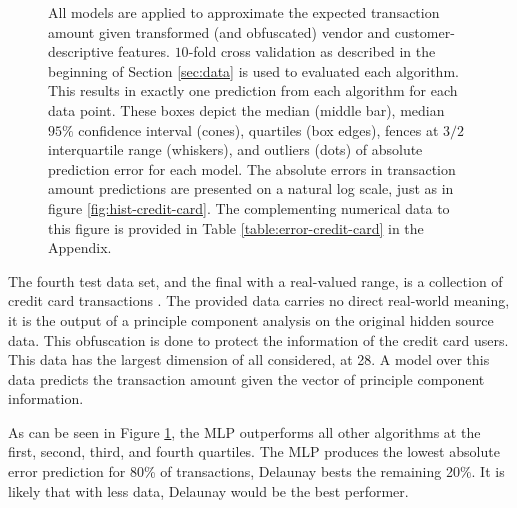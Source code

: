 \documentclass[smallextended,final]{svjour3}       %
\begin{document}
\begin{figure}
  \centering
  \caption{All models are applied to approximate the expected
    transaction amount given transformed (and obfuscated) vendor and
    customer-descriptive features. $10$-fold cross validation as
    described in the beginning of Section \ref{sec:data} is used to
    evaluated each algorithm. This results in exactly one prediction
    from each algorithm for each data point. These boxes depict the
    median (middle bar), median $95\%$ confidence interval (cones),
    quartiles (box edges), fences at $3/2$ interquartile range
    (whiskers), and outliers (dots) of absolute prediction error for
    each model. The absolute errors in transaction amount predictions
    are presented on a natural log scale, just as in figure
    \ref{fig:hist-credit-card}. The complementing numerical data to
    this figure is provided in Table \ref{table:error-credit-card} in
    the Appendix.}
  \label{fig:error-credit-card}
\end{figure}

The fourth test data set, and the final with a real-valued range, is a
collection of credit card transactions
\cite{pozzolo2015calibrating}. The provided data carries no direct
real-world meaning, it is the output of a principle component analysis
on the original hidden source data. This obfuscation is done to
protect the information of the credit card users. This data has the
largest dimension of all considered, at 28. A model over this data
predicts the transaction amount given the vector of principle
component information.

As can be seen in Figure \ref{fig:error-credit-card}, the MLP
outperforms all other algorithms at the first, second, third, and
fourth quartiles. The MLP produces the lowest absolute error
prediction for 80\% of transactions, Delaunay bests the remaining
20\%. It is likely that with less data, Delaunay would be the best
performer.
\end{document}
